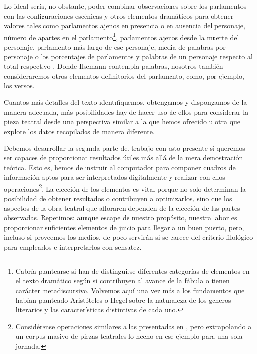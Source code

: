 Lo ideal sería, no obstante, poder combinar observaciones sobre los parlamentos con las configuraciones escénicas y otros elementos dramáticos para obtener valores tales como parlamentos ajenos en presencia o en ausencia del personaje, número de apartes en el parlamento\footnote{Cabría plantearse si han de distinguirse diferentes categorías de elementos en el texto dramático según si contribuyen al avance de la fábula o tienen carácter metadiscursivo. Volvemos aquí una vez más a los fundamentos que habían planteado Aristóteles o Hegel sobre la naturaleza de los géneros literarios y las características distintivas de cada uno.}, parlamentos ajenos desde la muerte del personaje, parlamento más largo de ese personaje, media de palabras por personaje o los porcentajes de parlamentos y palabras de un personaje respecto al total respectivo \parencite[12-13]{ilsemann1998}. Donde Ilsemann contempla palabras, nosotros también consideraremos otros elementos definitorios del parlamento, como, por ejemplo, los versos.

Cuantos más detalles del texto identifiquemos, obtengamos y dispongamos de la manera adecuada, más posibilidades hay de hacer uso de ellos para considerar la pieza teatral desde una perspectiva similar a la que hemos ofrecido u otra que explote los datos recopilados de manera diferente. 

Debemos desarrollar la segunda parte del trabajo con esto presente si queremos ser capaces de proporcionar resultados útiles más allá de la mera demostración teórica. Esto es, hemos de instruir al computador para componer cuadros de información aptos para ser interpretados digitalmente y realizar con ellos operaciones\footnote{Considérense operaciones similares a las presentadas en , pero extrapolando a un corpus masivo de piezas teatrales 	lo hecho en ese ejemplo para una sola jornada.}. La elección de los elementos es vital porque no solo determinan la posibilidad de obtener resultados o contribuyen a optimizarlos, sino que los aspectos de la obra teatral que afloraren dependen de la elección de las partes observadas. Repetimos: aunque escape de nuestro propósito, nuestra labor es proporcionar suficientes elementos de juicio para llegar a un buen puerto, pero, incluso si proveemos los medios, de poco servirán si se carece del criterio filológico para emplearlos e interpretarlos con sensatez.
